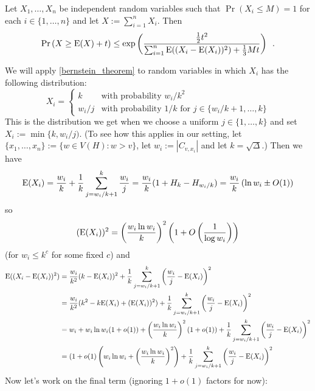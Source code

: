 \documentclass[kpfonts]{patmorin}
\begin{document}
\begin{thm}\label{bernstein_theorem}
  Let $X_1,\ldots,X_n$ be independent random variables such that $\Pr(X_i\le M)=1$ for each $i\in\{1,\ldots,n\}$ and let $X:=\sum_{i=1}^n X_i$. Then
  \begin{equation}
    \Pr\left(X \ge \mathrm{E}(X)+ t\right)
      \le \exp\left(\frac{\tfrac{1}{2}t^2}{\sum_{i=1}^n \mathrm{E}((X_i-\mathrm{E}(X_i))^2)+\tfrac{1}{3}Mt}\right) \enspace . \label{bernstein}
  \end{equation}
\end{thm}
We will apply \cref{bernstein_theorem} to random variables in which $X_i$ has the following distribution:
\[
  X_i = \begin{cases}
          k & \text{with probability $w_i/k^2$} \\
          w_i/j & \text{with probability $1/k$ for $j\in\{w_i/k+1,\ldots,k\}$}
        \end{cases}
\]
This is the distribution we get when we choose a uniform $j\in\{1,\ldots,k\}$ and set $X_i:=\min\{k,w_i/j)$.  (To see how this applies in our setting, let $\{x_1,\ldots,x_n\}:=\{w\in V(H):w>v\}$, let $w_i:=|C_{v,x_i}|$ and let $k=\sqrt{\Delta}$.)
Then we have
\[
  \mathrm{E}(X_i)=\frac{w_i}{k} + \frac{1}{k}\sum_{j=w_i/k+1}^k \frac{w_i}{j}
  = \frac{w_i}{k}(1+H_{k}-H_{w_i/k}) = \frac{w_i}{k}\left(\ln w_i \pm O(1) \right)
\]
so
\[
  (\mathrm{E}(X_i))^2 = \left(\frac{w_i\ln w_i}{k}\right)^2\left(1+O\left(\frac{1}{\log w_i}\right)\right)
\]
(for $w_i\le k^c$ for some fixed $c$)
and
\begin{align*}
  \mathrm{E}((X_i-\mathrm{E}(X_i))^2)
  & = \frac{w_i}{k^2}(k-\mathrm{E}(X_i))^2
    + \frac{1}{k}\sum_{j=w_i/k+1}^k \left(\frac{w_i}{j}-\mathrm{E}(X_i)\right)^2 \\
  & = \frac{w_i}{k^2}(k^2-k\mathrm{E}(X_i)+(\mathrm{E}(X_i))^2)
    + \frac{1}{k}\sum_{j=w_i/k+1}^k \left(\frac{w_i}{j}-\mathrm{E}(X_i)\right)^2 \\
  & = w_i + w_i\ln w_i(1+o(1)) + \left(\frac{w_i\ln w_i}{k}\right)^2(1+o(1))
    + \frac{1}{k}\sum_{j=w_i/k+1}^k \left(\frac{w_i}{j}-\mathrm{E}(X_i)\right)^2 \\
  & = (1+o(1)\left(w_i\ln w_i + \left(\frac{w_i\ln w_i}{k}\right)^2\right)
    + \frac{1}{k}\sum_{j=w_i/k+1}^k \left(\frac{w_i}{j}-\mathrm{E}(X_i)\right)^2
\end{align*}
Now let's work on the final term (ignoring $1+o(1)$ factors for now):
\end{document}
